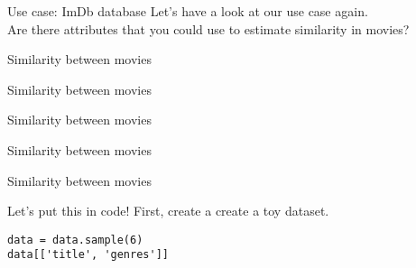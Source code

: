 \begin{frame}{Use case: ImDb database}
	Let's have a look at our use case again. \\
	Are there attributes that you could use to estimate similarity in movies?
\end{frame}



\begin{frame}{Similarity between movies}
\end{frame}

\begin{frame}{Similarity between movies}
\end{frame}

\begin{frame}{Similarity between movies}
\end{frame}

\begin{frame}{Similarity between movies}
\end{frame}

\begin{frame}{Similarity between movies}
\end{frame}

\begin{frame}[fragile]{Let's put this in code!}
	\pause
	First, create a create a toy dataset.
	\pause
	\begin{verbatim}
data = data.sample(6)
data[['title', 'genres']]
	\end{verbatim}
	\pause
\end{frame}

